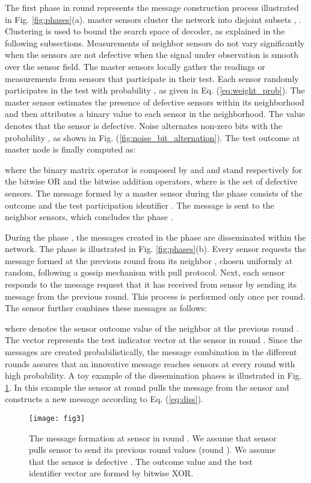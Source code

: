 \documentclass[journal]{IEEEtran}
\begin{document}
The first phase  in round  represents the message construction process illustrated in Fig. \ref{fig:phases}(a).  master sensors cluster the network into disjoint subsets , . Clustering is used to bound the search space of decoder, as explained in the following subsections. Measurements of neighbor sensors do not vary significantly when the sensors are not defective when the signal under observation is smooth over the sensor field. The master sensors locally gather the readings or measurements from sensors that participate in their test.   Each sensor randomly participates in the test with probability , as given in Eq. (\ref{eq:weight_prob}). The master sensor estimates the presence of defective sensors within its neighborhood and then attributes a binary value  to each sensor in the neighborhood. The value  denotes that the sensor  is defective. Noise alternates non-zero bits with the probability , as shown in Fig. (\ref{fig:noise_bit_alternation}). The test outcome at master node  is finally computed as:

where the binary matrix operator  is composed by  and  and stand respectively for the bitwise OR and the bitwise addition operators, where  is the set of defective sensors. The message formed by a master sensor  during the phase  consists of the outcome  and the test participation identifier . The message  is sent to the neighbor sensors, which concludes the phase . 

During the phase , the messages created in the phase  are disseminated within the network. The phase  is illustrated in Fig. \ref{fig:phases}(b). Every sensor  requests the message formed at the previous round from its neighbor , chosen uniformly at random, following a gossip mechanism with pull protocol. Next, each sensor  responds to the message request that it has received from sensor  by sending its message from the previous round. This process is performed only once per round. The sensor  further combines these messages as follows:

where  denotes the sensor outcome value of the neighbor  at the previous round . The vector  represents the test indicator vector at the sensor  in round . Since the messages are created probabilistically, the message combination in the different rounds assures that an innovative message reaches sensors at every round with high probability. A toy example of the dissemination phases is illustrated in Fig. \ref{fig:mess_form}. In this example the sensor  at round  pulls the message from the sensor  and constructs a new message according to Eq. (\ref{eq:diss}). 
\begin{figure}[htb]
\begin{center}
\texttt{[image: fig3]}
\end{center}
\caption{
The message formation at sensor  in round . We assume that sensor  pulls sensor  to send its previous round values (round ). We assume that the sensor  is defective . 
 The outcome value and the test identifier vector are formed by bitwise XOR.
 }
\label{fig:mess_form}
\end{figure}
\end{document}
